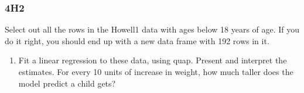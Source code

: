 \documentclass[
]{book}
\newenvironment{Shaded}{\begin{snugshade}}{\end{snugshade}}
\newcommand{\CommentTok}[1]{\textcolor[rgb]{0.56,0.35,0.01}{\textit{#1}}}
\newcommand{\DataTypeTok}[1]{\textcolor[rgb]{0.13,0.29,0.53}{#1}}
\newcommand{\DecValTok}[1]{\textcolor[rgb]{0.00,0.00,0.81}{#1}}
\newcommand{\KeywordTok}[1]{\textcolor[rgb]{0.13,0.29,0.53}{\textbf{#1}}}
\newcommand{\NormalTok}[1]{#1}
\newcommand{\OperatorTok}[1]{\textcolor[rgb]{0.81,0.36,0.00}{\textbf{#1}}}
\newcommand{\StringTok}[1]{\textcolor[rgb]{0.31,0.60,0.02}{#1}}
\providecommand{\tightlist}{%
  \setlength{\itemsep}{0pt}\setlength{\parskip}{0pt}}
\begin{document}
\hypertarget{h2-2}{%
\subsubsection*{4H2}\label{h2-2}}

Select out all the rows in the Howell1 data with ages below 18 years of age. If you do it right, you should end up with a new data frame with 192 rows in it.

\begin{enumerate}
\def\labelenumi{\alph{enumi}.}
\tightlist
\item
  Fit a linear regression to these data, using quap. Present and interpret the estimates. For
  every 10 units of increase in weight, how much taller does the model predict a child gets?
\end{enumerate}

\begin{Shaded}
\end{Shaded}
\end{document}
